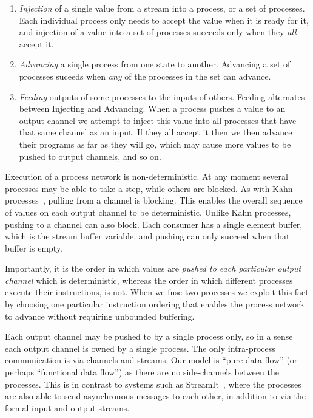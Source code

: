 \begin{enumerate}
\item \emph{Injection} of a single value from a stream into a process, or a set of processes. Each individual process only needs to accept the value when it is ready for it, and injection of a value into a set of processes succeeds only when they \emph{all} accept it.

\item \emph{Advancing} a single process from one state to another. Advancing a set of processes suceeds when \emph{any} of the processes in the set can advance.

\item \emph{Feeding} outputs of some processes to the inputs of others. Feeding alternates between Injecting and Advancing. When a process pushes a value to an output channel we attempt to inject this value into all processes that have that same channel as an input. If they all accept it then we then advance their programs as far as they will go, which may cause more values to be pushed to output channels, and so on.
\end{enumerate}

Execution of a process network is non-deterministic. At any moment several processes may be able to take a step, while others are blocked. As with Kahn processes~\cite{kahn1976coroutines}, pulling from a channel is blocking. This enables the overall sequence of values on each output channel to be deterministic. Unlike Kahn processes, pushing to a channel can also block. Each consumer has a single element buffer, which is the stream buffer variable, and pushing can only succeed when that buffer is empty.


Importantly, it is the order in which values are \emph{pushed to each particular output channel} which is deterministic, whereas the order in which different processes execute their instructions, is not. When we fuse two processes we exploit this fact by choosing one particular instruction ordering that enables the process network to advance without requiring unbounded buffering.

Each output channel may be pushed to by a single process only, so in a sense each output channel is owned by a single process. The only intra-process communication is via channels and streams. Our model is ``pure data flow'' (or perhaps ``functional data flow'') as there are no side-channels between the processes. This is in contrast to systems such as StreamIt~\cite{thies2002streamit}, where the processes are also able to send asynchronous messages to each other, in addition to via the formal input and output streams.


